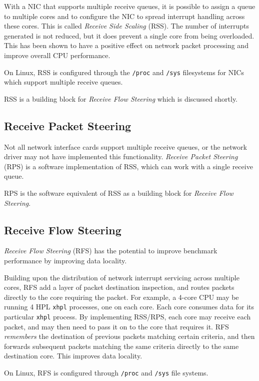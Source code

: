 With a NIC that supports multiple receive queues, it is possible to assign a queue to multiple cores and to configure the NIC to spread interrupt handling across these cores. This is called \emph{Receive Side Scaling} (RSS). The number of interrupts generated is not reduced, but it does prevent a single core from being overloaded. This has been shown to have a positive effect on network packet processing and improve overall CPU performance.

On Linux, RSS is configured through the \verb|/proc| and \verb|/sys| filesystems for NICs which support multiple receive queues.

RSS is a building block for \emph{Receive Flow Steering} which is discussed shortly.


\subsection{Receive Packet Steering}

Not all network interface cards support multiple receive queues, or the network driver may not have implemented this functionality. \emph{Receive Packet Steering} (RPS) is a software implementation of RSS, which can work with a single receive queue. 

RPS is the software equivalent of RSS as a building block for \emph{Receive Flow Steering}.


\subsection{Receive Flow Steering}

\emph{Receive Flow Steering} (RFS) has the potential to improve benchmark performance by improving data locality.

Building upon the distribution of network interrupt servicing across multiple cores, RFS add a layer of packet destination inspection, and routes packets directly to the core requiring the packet. For example, a 4-core CPU may be running 4 HPL \verb|xhpl| processes, one on each core. Each core consumes data for its particular \verb|xhpl| process. By implementing RSS/RPS, each core may receive each packet, and may then need to pass it on to the core that requires it. RFS \emph{remembers} the destination of previous packets matching certain criteria, and then forwards subsequent packets matching the same criteria directly to the same destination core. This improves data locality.

On Linux, RFS is configured through \verb|/proc| and \verb|/sys| file systems.


